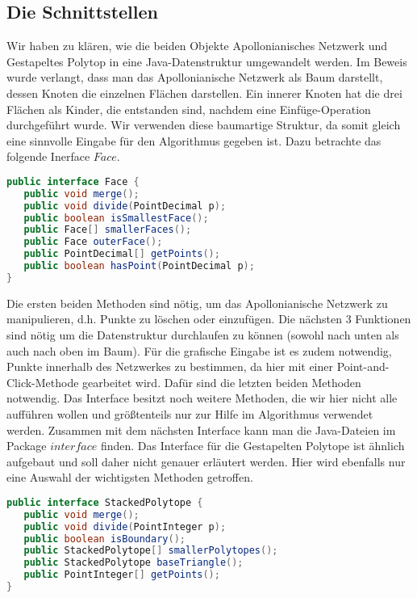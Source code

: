 \subsection*{Die Schnittstellen}
Wir haben zu klären, wie die beiden Objekte Apollonianisches Netzwerk und Gestapeltes Polytop in eine Java-Datenstruktur umgewandelt werden. Im Beweis wurde verlangt, dass man das Apollonianische Netzwerk als Baum darstellt, dessen Knoten die einzelnen Flächen darstellen. Ein innerer Knoten hat die drei Flächen als Kinder, die entstanden sind, nachdem eine Einfüge-Operation durchgeführt wurde. Wir verwenden diese baumartige Struktur, da somit gleich eine sinnvolle Eingabe für den Algorithmus gegeben ist. Dazu betrachte das folgende Inerface $Face$.

\begin{lstlisting}[language=Java, caption={Ausschnitt aus dem Face-Interface}]
public interface Face {
   public void merge();
   public void divide(PointDecimal p);
   public boolean isSmallestFace();
   public Face[] smallerFaces();
   public Face outerFace();
   public PointDecimal[] getPoints();
   public boolean hasPoint(PointDecimal p);
}
\end{lstlisting}

Die ersten beiden Methoden sind nötig, um das Apollonianische Netzwerk zu manipulieren, d.h. Punkte zu löschen oder einzufügen. Die nächsten 3 Funktionen sind nötig um die Datenstruktur durchlaufen zu können (sowohl nach unten als auch nach oben im Baum). Für die grafische Eingabe ist es zudem notwendig, Punkte innerhalb des Netzwerkes zu bestimmen, da hier mit einer Point-and-Click-Methode gearbeitet wird. Dafür sind die letzten beiden Methoden notwendig. Das Interface besitzt noch weitere Methoden, die wir hier nicht alle aufführen wollen und größtenteils nur zur Hilfe im Algorithmus verwendet werden. Zusammen mit dem nächsten Interface kann man die Java-Dateien im Package $interface$ finden. Das Interface für die Gestapelten Polytope ist ähnlich aufgebaut und soll daher nicht genauer erläutert werden. Hier wird ebenfalls nur eine Auswahl der wichtigsten Methoden getroffen.

\begin{lstlisting}[language=Java, caption={Ausschnitt aus dem StackedPolytope-Interface}]
public interface StackedPolytope {
   public void merge();
   public void divide(PointInteger p);
   public boolean isBoundary();
   public StackedPolytope[] smallerPolytopes();
   public StackedPolytope baseTriangle();
   public PointInteger[] getPoints();
}
\end{lstlisting}

